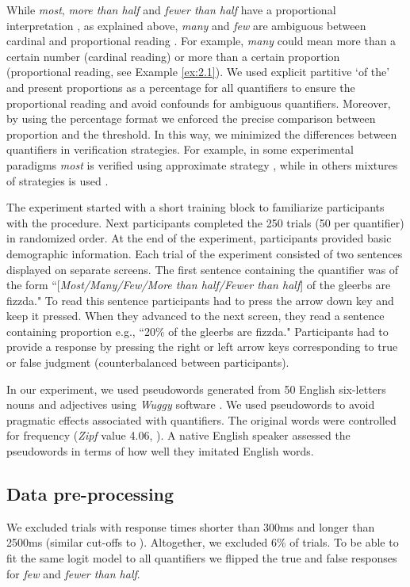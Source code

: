 \documentclass{article}
\begin{document}
While \textit{most}, \textit{more than half} and \textit{fewer than half} have a proportional interpretation \cite{Hackl2009}, as explained above, \textit{many} and \textit{few} are ambiguous between cardinal and proportional reading \cite{Partee1988ManyQuantifiers}. For example, \textit{many} could mean more than a certain number (cardinal reading) or more than a certain proportion (proportional reading, see Example \ref{ex:2.1}). We used explicit partitive `of the' and present proportions as a percentage for all quantifiers to ensure the proportional reading and avoid confounds for ambiguous quantifiers. Moreover, by using the percentage format we enforced the precise comparison between proportion and the threshold. In this way, we minimized the differences between quantifiers in verification strategies. For example, in some experimental paradigms \textit{most} is verified using approximate strategy \cite{Pietroski2009}, while in others mixtures of strategies is used \cite{Talmina2017}.

The experiment started with a short training block to familiarize participants with the procedure. Next participants completed the 250 trials (50 per quantifier) in randomized order. At the end of the experiment, participants provided basic demographic information.
Each trial of the experiment consisted of two sentences displayed on separate screens. The first sentence containing the quantifier was of the form ``[\textit{Most/Many/Few/More than half/Fewer than half}] of the gleerbs are fizzda." To read this sentence participants had to press the arrow down key and keep it pressed. When they advanced to the next screen, they read a sentence containing proportion e.g., ``20\% of the gleerbs are fizzda." Participants had to provide a response by pressing the right or left arrow keys corresponding to true or false judgment (counterbalanced between participants).

In our experiment, we used pseudowords generated from 50 English six-letters nouns and adjectives using \textit{Wuggy} software \cite{Keuleers2010Wuggy:Generator}. We used pseudowords to avoid pragmatic effects associated with quantifiers. The original words were controlled for frequency (\textit{Zipf} value 4.06, ). A native English speaker assessed the pseudowords in terms of how well they imitated English words.


\subsection{Data pre-processing}
We excluded trials with response times shorter than 300ms and longer than 2500ms (similar cut-offs to ). Altogether, we excluded 6\% of trials. To be able to fit the same logit model to all quantifiers we flipped the true and false responses for \textit{few} and \textit{fewer than half}.
\end{document}
